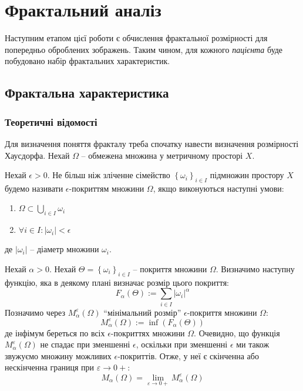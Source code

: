 
\chapter{Фрактальний аналіз} %

\label{Chapter3} %


Наступним етапом цієї роботи є обчислення фрактальної розмірності для попередньо оброблених зображень. Таким чином, для кожного \textit{пацієнта} буде побудовано набір фрактальних характеристик.

\section{Фрактальна характеристика}
\subsection{Теоретичні відомості}

Для визначення поняття фракталу треба спочатку навести визначення розмірності Хаусдорфа. Нехай $\Omega$ -- обмежена множина у метричному просторі $X$.

\begin{defn}
	Нехай $\epsilon > 0$. Не більш ніж зліченне сімейство $\left\{ \omega_i \right\}_{i \in I}$ підмножин простору $X$ будемо називати \textbf{$\epsilon \textit{-покриттям}$} множини $\Omega$, якщо виконуються наступні умови:
	\begin{enumerate}[label=(\arabic*),ref=(\arabic*)]
		\item $\Omega \subset \bigcup\limits_{i \in I}{\omega_i}$
		\item $\forall i \in I: |\omega_i| < \epsilon$
	\end{enumerate}
	де $|\omega_i|$ -- діаметр множини $\omega_i$.
\end{defn}

Нехай $\alpha > 0$. Нехай $\Theta = \left\{ \omega_i \right\}_{i \in I}$ -- покриття множини $\Omega$. Визначимо наступну функцію, яка в деякому плані визначає розмір цього покриття: 
$$F_\alpha(\Theta):=\sum\limits_{i\in I} |\omega_i|^\alpha$$
Позначимо через $M^{\varepsilon}_{\alpha}(\Omega)$ \enquote{мінімальний розмір} $\epsilon$-покриття множини $\Omega$:
$$M^{\varepsilon}_{\alpha}(\Omega) := \inf(F_\alpha(\Theta))$$
де інфімум береться по всіх $\epsilon$-покриттях множини $\Omega$. Очевидно, що функція $M^{\varepsilon}_{\alpha}(\Omega)$ не спадає при зменшенні $\epsilon$, оскільки при зменшенні $\epsilon$ ми також звужуємо множину можливих $\epsilon$-покриттів. Отже, у неї є скінченна або нескінченна границя при $\varepsilon\rightarrow 0+$:
$$M_{\alpha}(\Omega)=\lim\limits_{\varepsilon\rightarrow 0+}M^{\varepsilon}_{\alpha}(\Omega)$$

